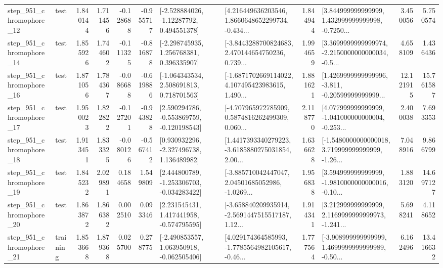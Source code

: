 \begin{tabular}{llrrrrllrlrr}
  step\_951\_chromophore\_12 &      test &      1.840144 &    1.711456 &     -0.128688 & -0.955717 &    [-2.528884026, -1.12287792, 0.494551378] &  [4.216449636203546, 1.8660648652299734, -0.434... &       1.844944 &  [3.844999999999999, 1.432999999999998, -0.7250... &            3.450056 &          5.750574 \\
  step\_951\_chromophore\_14 &      test &      1.855926 &    1.744602 &     -0.111325 & -0.816878 &    [-2.298745935, 1.256768381, 0.396335907] &  [-3.8443288700824683, 2.470144654750236, 0.739... &       1.994659 &  [3.3699999999999974, -2.2150000000000034, -0.5... &            4.658109 &          1.436436 \\
  step\_951\_chromophore\_16 &      test &      1.871056 &    1.784367 &     -0.086688 & -0.619886 &    [-1.064343534, 2.508691813, 0.718701563] &  [-1.6871702669114022, 4.107495423983615, 1.490... &       1.881621 &  [1.4269999999999996, -3.811, -0.20599999999999... &           12.121915 &         15.761587 \\
  step\_951\_chromophore\_17 &      test &      1.950023 &    1.822822 &     -0.127201 & -0.943828 &   [2.590294786, -0.553869759, -0.120198543] &  [-4.707965972785909, 0.5874816262499309, 0.060... &       2.118770 &  [4.077999999999999, -1.041000000000004, -0.253... &            2.400038 &          7.693353 \\
  step\_951\_chromophore\_18 &      test &      1.913451 &    1.833325 &     -0.080126 & -0.567412 &    [0.930932296, -2.327496738, 1.136489982] &  [1.4417393340279223, -3.6185880275031854, 2.00... &       1.636628 &  [-1.5480000000000018, 3.719999999999999, -1.26... &            7.048916 &          9.866799 \\
  step\_951\_chromophore\_19 &      test &      1.845232 &    2.029891 &      0.184658 &  1.549809 &   [2.444800789, -1.253306703, -0.034283422] &  [-3.885710042447047, 2.04501685052986, -1.0269... &       1.956838 &  [3.594999999999999, -1.9810000000000016, -0.10... &            1.883120 &         14.697127 \\
  step\_951\_chromophore\_20 &      test &      1.863872 &    1.866382 &      0.002510 &  0.093346 &    [2.231545431, 1.417441958, -0.574795595] &  [-3.658840209935914, -2.5691447515517187, 1.12... &       1.914341 &  [3.212999999999999, 2.1169999999999973, -1.241... &            5.698241 &          4.118652 \\
  step\_951\_chromophore\_21 &  training &      1.853668 &    1.879368 &      0.025700 &  0.278775 &   [-2.490853557, 1.063950918, -0.062505406] &  [4.029174364585993, -1.7785564982105617, -0.46... &       1.777564 &  [-3.908999999999999, 1.4699999999999989, -0.50... &            6.162496 &         13.416632 \\

\end{tabular}
